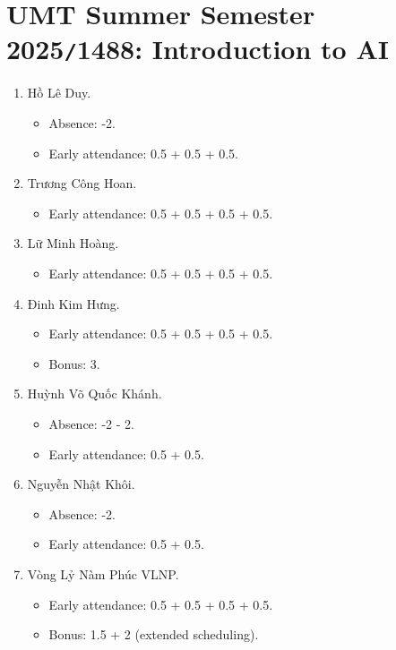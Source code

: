 \documentclass{article}
\begin{document}

\section{UMT Summer Semester 2025{\tt/}1488: Introduction to AI}

\begin{enumerate}
	\item {\sc Hồ Lê Duy.} 
	\begin{itemize}
		\item Absence: -2.
		\item Early attendance: 0.5 + 0.5 + 0.5.
	\end{itemize}
	\item {\sc Trương Công Hoan.}
	\begin{itemize}
		\item Early attendance: 0.5 + 0.5 + 0.5 + 0.5.
	\end{itemize}
	\item {\sc Lữ Minh Hoàng.}
	\begin{itemize}
		\item Early attendance: 0.5 + 0.5 + 0.5 + 0.5.
	\end{itemize}
	\item {\sc Đinh Kim Hưng.}
	\begin{itemize}
		\item Early attendance: 0.5 + 0.5 + 0.5 + 0.5.
		\item Bonus: 3.
	\end{itemize}
	\item {\sc Huỳnh Võ Quốc Khánh.}
	\begin{itemize}
		\item Absence: -2 - 2.
		\item Early attendance: 0.5 + 0.5.
	\end{itemize}
	\item {\sc Nguyễn Nhật Khôi.}
	\begin{itemize}
		\item Absence: -2.
		\item Early attendance: 0.5 + 0.5.
	\end{itemize}
	\item {\sc Vòng Lỷ Nàm Phúc {VLNP}.}
	\begin{itemize}
		\item Early attendance: 0.5 + 0.5 + 0.5 + 0.5.
		\item Bonus: 1.5 + 2 (extended scheduling).
	\end{itemize}

\end{enumerate}
\end{document}
